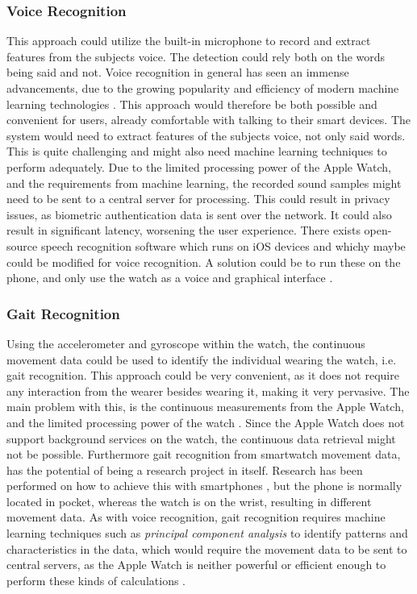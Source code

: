 \subsubsection{Voice Recognition}
This approach could utilize the built-in microphone to record and extract
features from the subjects voice. The detection could rely both on the words
being said and not. Voice recognition in general has seen an immense
advancements, due to the growing popularity and efficiency of modern machine 
learning technologies \cite{6296526}. 
This approach would therefore be both possible and convenient for users, already 
comfortable with talking to their smart devices. 
The system would need to extract features of the subjects voice, not only said
words. This is quite challenging and might also need machine learning techniques to
perform adequately. Due to the limited processing power of the Apple Watch, and
the requirements from machine learning, the recorded sound samples might need to
be sent to a central server for processing. This could result in privacy issues,
as biometric authentication data is sent over the network. It could also result
in significant latency, worsening the user experience. There exists open-source
speech recognition software which runs on iOS devices and whichy maybe could be
modified for voice recognition. A solution could be to run these on the phone,
and only use the watch as a voice and graphical interface \cite{spearsite}.

\subsubsection{Gait Recognition}
Using the accelerometer and gyroscope within the watch, the continuous movement
data could be used to identify the individual wearing the watch, i.e. gait
recognition. This approach could be very convenient, as it does not require any
interaction from the wearer besides wearing it, making it very pervasive.
The main problem with this, is the continuous measurements from the Apple Watch, and the
limited processing power of the watch \cite{ferrero2015a}. Since the Apple Watch
does not support background services on the watch, the continuous data retrieval
might not be possible. Furthermore gait recognition from smartwatch movement
data, has the potential of being a research project in itself. Research has been
performed on how to achieve this with smartphones \cite{ferrero2015a}, but the 
phone is normally located in pocket, whereas the watch is on the wrist, 
resulting in different movement data. As with voice recognition, gait
recognition requires machine learning techniques such as \textit{principal
    component analysis} to identify patterns and characteristics in the data,
    which would require the movement data to be sent to central servers, as the
    Apple Watch is neither powerful or efficient enough to perform these kinds
    of calculations \cite{dawson2008a}.

